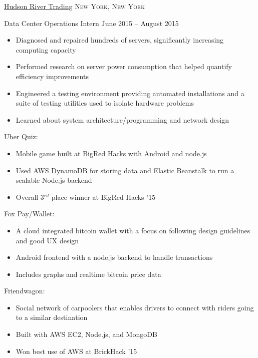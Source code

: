 \documentclass[11pt]{article}
\begin{document}
\headedsection  %
{\href{http://www.hudson-trading.com/}{Hudson River Trading}}
{\textsc{New York, New York}} {
    \headedsubsection
    {Data Center Operations Intern}
    {June 2015 -- August 2015}
    {
        \begin{itemize}
            \item Diagnosed and repaired hundreds of servers, significantly increasing computing capacity
            \item Performed research on server power consumption that helped quantify efficiency improvements
            \item Engineered a testing environment providing automated installations and a suite of testing utilities used to isolate hardware problems
            \item Learned about system architecture/programming and network design
        \end{itemize}
    }
}


\spacedhrule{0.1em}{0.9em}  %

\headedsubsection
{Uber Quiz:}{}
{
    \begin{itemize}[leftmargin=0.5in]
        \item{Mobile game built at BigRed Hacks with Android and node.js}
        \item{Used AWS DynamoDB for storing data and Elastic Beanstalk to run a scalable Node.js backend}
        \item{Overall 3$^{rd}$ place winner at BigRed Hacks '15}
    \end{itemize}
}

\headedsubsection %
{Fox Pay/Wallet:}{}
{
    \begin{itemize}[leftmargin=0.5in]
        \item{A cloud integrated bitcoin wallet with a focus on following design guidelines and good UX design}
        \item{Android frontend with a node.js backend to handle transactions}
        \item{Includes graphs and realtime bitcoin price data}
    \end{itemize}
}

\headedsubsection
{Friendwagon:}{}
{
    \begin{itemize}[leftmargin=0.5in]
        \item{Social network of carpoolers that enables drivers to connect with riders going to a similar destination}
        \item{Built with AWS EC2, Node.js, and MongoDB}
        \item{Won best use of AWS at BrickHack '15}
    \end{itemize}
}
\end{document}
